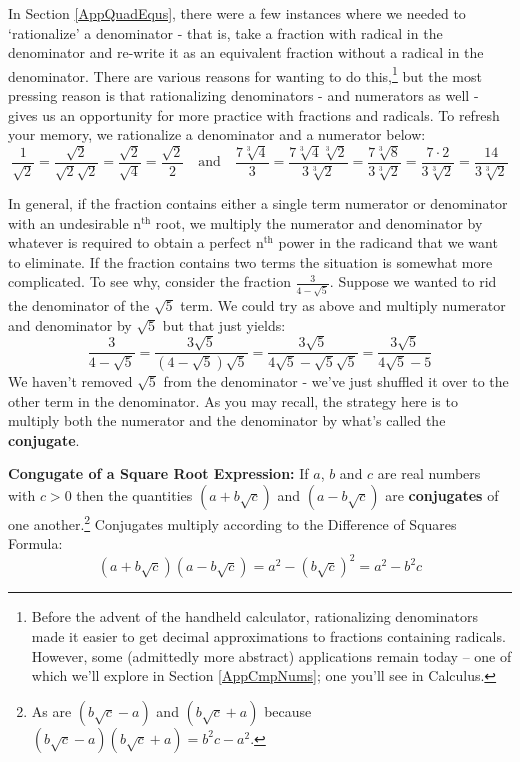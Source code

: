 \documentclass{ximera}
\begin{document}
{{{In Section \ref{AppQuadEqus}, there were a few instances where we needed to `rationalize' a denominator - that is, take a fraction with radical in the denominator and re-write it as an equivalent fraction without a radical in the denominator.  There are various reasons for wanting to do this,\footnote{Before the advent of the handheld calculator, rationalizing denominators made it easier to get decimal approximations to fractions containing radicals.   However, some (admittedly more abstract) applications remain today --  one of which we'll explore in Section \ref{AppCmpNums}; one you'll see in Calculus.} but the most pressing reason is that rationalizing denominators - and numerators as well - gives us an opportunity for more practice with fractions and radicals. To refresh your memory, we rationalize a denominator and a numerator below: \[ \dfrac{1}{\sqrt{2}} = \dfrac{\sqrt{2}}{\sqrt{2} \sqrt{2}} = \dfrac{\sqrt{2}}{\sqrt{4}} = \dfrac{\sqrt{2}}{2} \quad \text{and} \quad \dfrac{7\sqrt[3]{4}}{3} = \dfrac{7 \sqrt[3]{4}\sqrt[3]{2}}{3\sqrt[3]{2}} = \dfrac{7\sqrt[3]{8}}{3\sqrt[3]{2}} = \dfrac{7 \cdot 2}{3\sqrt[3]{2}} =  \dfrac{14}{3\sqrt[3]{2}} \]

In general, if the fraction contains either a single term numerator or denominator with an undesirable $\text{n}^{\text{th}}$ root, we multiply the numerator and denominator by whatever is required to obtain a perfect $\text{n}^{\text{th}}$ power in the radicand that we want to eliminate. If the fraction contains two terms the situation is somewhat more complicated.  To see why, consider the fraction $\frac{3}{4 - \sqrt{5}}$.  Suppose we wanted to rid the denominator of the $\sqrt{5}$ term.  We could try as above and multiply numerator and denominator by $\sqrt{5}$ but that just yields: \[ \dfrac{3}{4 - \sqrt{5}} = \dfrac{3\sqrt{5}}{(4 - \sqrt{5})\sqrt{5}} = \dfrac{3\sqrt{5}}{4\sqrt{5} - \sqrt{5}\sqrt{5}} = \dfrac{3\sqrt{5}}{4\sqrt{5} - 5}\] We haven't removed $\sqrt{5}$ from the denominator - we've just shuffled it over to the other term in the denominator.  As you may recall, the strategy here is to multiply both the numerator and the denominator by what's called the \textbf{conjugate}.  

\medskip

\colorbox{ResultColor}{\bbm

\begin{definition}\label{squarerootconj} \textbf{Congugate of a Square Root Expression:}  If $a$, $b$ and $c$ are real numbers with $c > 0$ then the quantities $(a + b \sqrt{c})$ and $(a - b\sqrt{c})$ are \textbf{conjugates} of one another.\footnote{As are $(b\sqrt{c} -a)$ and $(b\sqrt{c} + a)$ because $(b\sqrt{c} -a)(b\sqrt{c} + a) = b^2c - a^2$.}  Conjugates multiply according to the Difference of Squares Formula:  \[ (a + b \sqrt{c})(a - b\sqrt{c}) = a^2 - (b \sqrt{c})^2 = a^2 - b^2c\]
\end{definition}

}}}}
\end{document}
